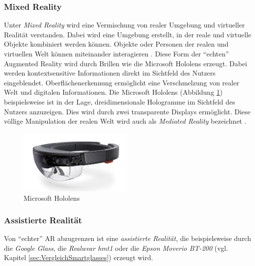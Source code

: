 %
\subsubsection{Mixed Reality}
%
Unter \emph{Mixed Reality} wird eine Vermischung von realer Umgebung und virtueller Realität verstanden. Dabei wird eine Umgebung erstellt, in der reale und virtuelle Objekte kombiniert werden können. Objekte oder Personen der realen und virtuellen Welt können miteinander interagieren \cite{Schanze2017}. Diese Form der \enquote{echten} Augmented Reality wird durch Brillen wie die Microsoft Hololens erzeugt. Dabei werden kontextsensitive Informationen direkt im Sichtfeld des Nutzers eingeblendet. Oberflächenerkennung ermöglicht eine Verschmelzung von realer Welt und digitalen Informationen. Die Microsoft Hololens (Abbildung \ref{fig:Microsoft_Hololens}) beispielsweise ist in der Lage, dreidimensionale Hologramme im Sichtfeld des Nutzers anzuzeigen. Dies wird durch zwei transparente Displays ermöglicht. Diese völlige Manipulation der realen Welt wird auch als \emph{Mediated Reality} bezeichnet \cite[S.~46]{Schwenke2016}.
%
\begin{figure}[htbp]
    \centering
    \includegraphics[width=0.5\textwidth]{data/bilder/Microsoft_Hololens.pdf}
    \caption{Microsoft Hololens \cite{O.V.}}
    \label{fig:Microsoft_Hololens}
\end{figure}
%
%

\subsubsection{Assistierte Realität}
\label{sec:AssistierteRealitaet}
%
Von \enquote{echter} AR abzugrenzen ist eine \emph{assistierte Realität}, die beispielsweise durch die \emph{Google Glass}, die \emph{Realwear hmt1} oder die \emph{Epson Moverio BT-200} (vgl. Kapitel \ref{sec:VergleichSmartglasses}) erzeugt wird.

